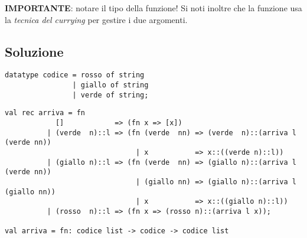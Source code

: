 \medskip
\textbf{IMPORTANTE}: notare il tipo della funzione! Si noti inoltre che la funzione usa la \emph{tecnica del currying} per gestire i due argomenti.

\subsection{Soluzione}

\begin{lstlisting}[style = SML, nolol = true, caption = {Definizione del tipo di dato \sml{codice}}]
datatype codice = rosso of string
				| giallo of string
				| verde of string;
\end{lstlisting}

\begin{lstlisting}[style = SML, caption = {Definizione della funzione \sml{arriva}}]
val rec arriva = fn
		    []			  => (fn x => [x])
		  | (verde  n)::l => (fn (verde  nn) => (verde  n)::(arriva l (verde nn))
							   | x           => x::((verde n)::l))
		  | (giallo n)::l => (fn (verde  nn) => (giallo n)::(arriva l (verde nn))
		  					   | (giallo nn) => (giallo n)::(arriva l (giallo nn))
							   | x           => x::((giallo n)::l))
		  | (rosso  n)::l => (fn x => (rosso n)::(arriva l x));

val arriva = fn: codice list -> codice -> codice list
\end{lstlisting}
